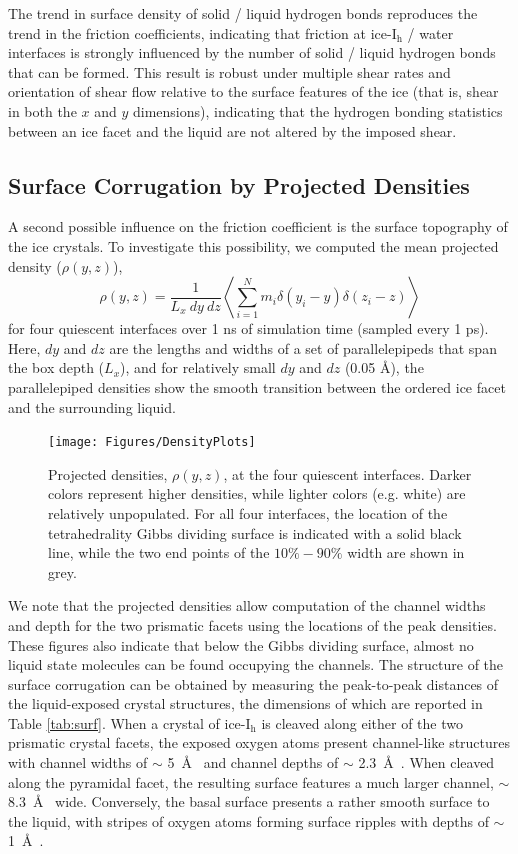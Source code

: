 The trend in surface density of solid / liquid hydrogen bonds
reproduces the trend in the friction coefficients, indicating that
friction at ice-I$_\mathrm{h}$ / water interfaces is strongly influenced
by the number of solid / liquid hydrogen bonds that can be formed.
This result is robust under multiple shear rates and orientation of
shear flow relative to the surface features of the ice (that is, shear
in both the $x$ and $y$ dimensions), indicating that the hydrogen
bonding statistics between an ice facet and the liquid are not altered
by the imposed shear.

\subsection{Surface Corrugation by Projected Densities}
A second possible influence on the friction coefficient is the surface
topography of the ice crystals. To investigate this possibility, we
computed the mean projected density ($\rho(y,z)$),
\begin{equation}
\rho(y, z) = \frac{1}{L_x~dy~dz} \left< \sum_{i = 1}^{N} m_i \delta(y_i - y) \delta(z_i - z)\right>
\end{equation}
for four quiescent interfaces over 1 ns of simulation time (sampled
every 1 ps).  Here, $dy$ and $dz$ are the lengths and widths of a set of
parallelepipeds that span the box depth ($L_x$), and for relatively
small $dy$ and $dz$ (0.05 \AA), the parallelepiped densities show the
smooth transition between the ordered ice facet and the surrounding
liquid.

\begin{figure}
\texttt{[image: Figures/DensityPlots]}
\caption{\label{fig:DensPlots} Projected densities, $\rho(y, z)$, at
  the four quiescent interfaces.  Darker colors represent higher
  densities, while lighter colors (e.g. white) are relatively
  unpopulated.  For all four interfaces, the location of the
  tetrahedrality Gibbs dividing surface is indicated with a solid
  black line, while the two end points of the $10\%-90\%$ width are
  shown in grey.}
\end{figure}

We note that the projected densities allow computation of the channel
widths and depth for the two prismatic facets using the locations of
the peak densities.  These figures also indicate that below the Gibbs
dividing surface, almost no liquid state molecules can be found
occupying the channels.  The structure of the surface corrugation can
be obtained by measuring the peak-to-peak distances of the
liquid-exposed crystal structures, the dimensions of which are
reported in Table \ref{tab:surf}. When a crystal of ice-I$_\mathrm{h}$
is cleaved along either of the two prismatic crystal facets, the
exposed oxygen atoms present channel-like structures with channel
widths of $\sim$ 5~\AA~ and channel depths of $\sim$ 2.3~\AA~.  When
cleaved along the pyramidal facet, the resulting surface features a
much larger channel, $\sim$ 8.3~\AA~ wide.  Conversely, the basal
surface presents a rather smooth surface to the liquid, with stripes
of oxygen atoms forming surface ripples with depths of $\sim$ 1~\AA~.

